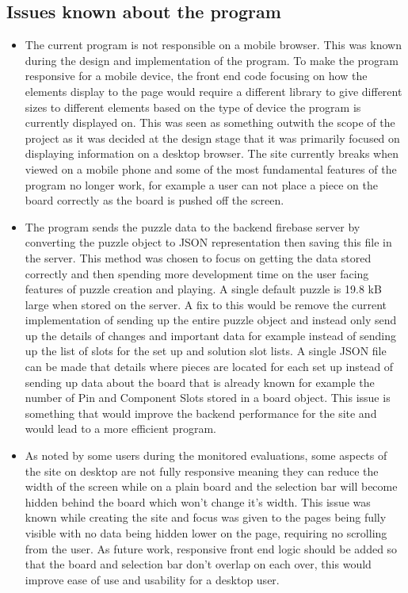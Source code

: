 \documentclass{l4proj}
\begin{document}
\subsection{Issues known about the program}
\begin{itemize}
    \item The current program is not responsible on a mobile browser. This was known during the design and implementation of the program. To make the program responsive for a mobile device, the front end code focusing on how the elements display to the page would require a different library to give different sizes to different elements based on the type of device the program is currently displayed on. This was seen as something outwith the scope of the project as it was decided at the design stage that it was primarily focused on displaying information on a desktop browser. The site currently breaks when viewed on a mobile phone and some of the most fundamental features of the program no longer work, for example a user can not place a piece on the board correctly as the board is pushed off the screen.
    \item The program sends the puzzle data to the backend firebase server by converting the puzzle object to JSON representation then saving this file in the server. This method was chosen to focus on getting the data stored correctly and then spending more development time on the user facing features of puzzle creation and playing. A single default puzzle is 19.8 kB large when stored on the server. A fix to this would be remove the current implementation of sending up the entire puzzle object and instead only send up the details of changes and important data for example instead of sending up the list of slots for the set up and solution slot lists. A single JSON file can be made that details where pieces are located for each set up instead of sending up data about the board that is already known for example the number of Pin and Component Slots stored in a board object. This issue is something that would improve the backend performance for the site and would lead to a more efficient program. 
    \item As noted by some users during the monitored evaluations, some aspects of the site on desktop are not fully responsive meaning they can reduce the width of the screen while on a plain board and the selection bar will become hidden behind the board which won't change it's width. This issue was known while creating the site and focus was given to the pages being fully visible with no data being hidden lower on the page, requiring no scrolling from the user. As future work, responsive front end logic should be added so that the board and selection bar don't overlap on each over, this would improve ease of use and usability for a desktop user.

\end{itemize}
\end{document}
